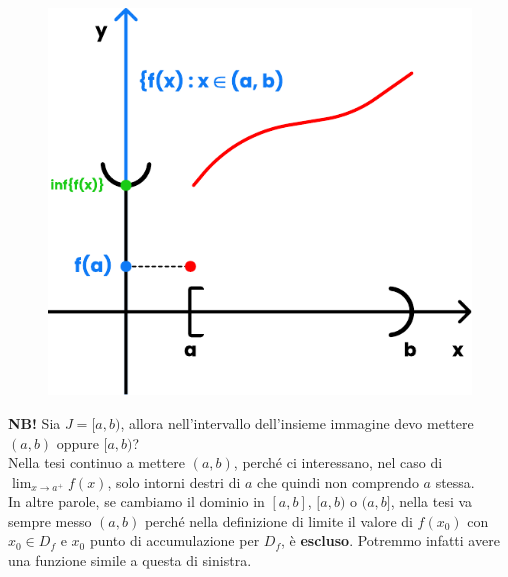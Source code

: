 \documentclass{article}
\begin{document}
\begin{figure}
\includegraphics[width=0.7\linewidth]{images/monotonicFunctionsLimits.pdf} 
\end{figure}

\noindent\textbf{NB!} Sia $J = [a, b)$, allora nell'intervallo dell'insieme immagine devo mettere $(a, b)$ oppure $[a, b)$? \\
Nella tesi continuo a mettere $(a, b)$, perché ci interessano, nel caso di $\lim_{x \to a^+} f(x)$, solo intorni destri di $a$ che quindi non comprendo $a$ stessa. \\
In altre parole, se cambiamo il dominio in $[a, b]$, $[a, b)$ o $(a, b]$, nella tesi va sempre messo $(a, b)$ perché nella definizione di limite il valore di $f(x_0)$ con $x_0 \in D_f$ e $x_0$ punto di accumulazione per $D_f$, è \textbf{escluso}. Potremmo infatti avere una funzione simile a questa di sinistra.
\end{document}
